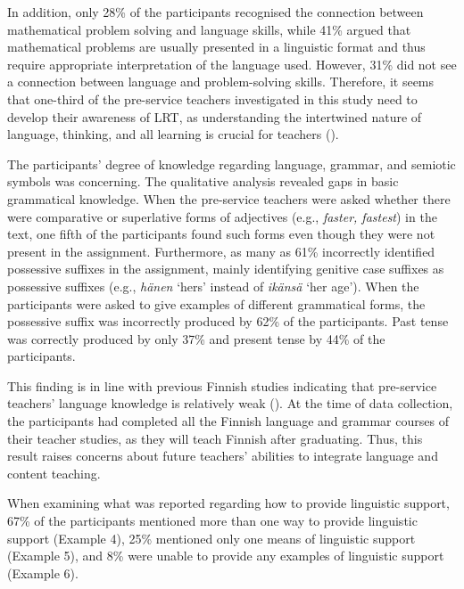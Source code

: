 \documentclass[output=paper]{langscibook}
\begin{document}
In addition, only 28\% of the participants recognised the connection between mathematical problem solving and language skills, while 41\% argued that mathematical problems are usually presented in a linguistic format and thus require appropriate interpretation of the language used. However, 31\% did not see a connection between language and problem-solving skills. Therefore, it seems that one-third of the pre-service teachers investigated in this study need to develop their awareness of LRT, as understanding the intertwined nature of language, thinking, and all learning is crucial for teachers (\citealt{Alisaari2020_Apples,CumminsEarly2015,LucasVillegas2013,Vygotsky1986}).

\begin{sloppypar}
The participants’ degree of knowledge regarding language, grammar, and semiotic symbols was concerning. The qualitative analysis revealed gaps in basic grammatical knowledge. When the pre-service teachers were asked whether there were comparative or superlative forms of adjectives (e.g., \textit{faster, fastest}) in the text, one fifth of the participants found such forms even though they were not present in the assignment. Furthermore, as many as 61\% incorrectly identified possessive suffixes in the assignment, mainly identifying genitive case suffixes as possessive suffixes (e.g., \textit{hänen} `hers' instead of \textit{ikänsä} `her age'). When the participants were asked to give examples of different grammatical forms, the possessive suffix was incorrectly produced by 62\% of the participants. Past tense was correctly produced by only 37\% and present tense by 44\% of the participants.
\end{sloppypar}

This finding is in line with previous Finnish studies indicating that pre-service teachers’ language knowledge is relatively weak (\citealt{TainioMarjokorpi2014,TainioRoutarinne2012}). At the time of data collection, the participants had completed all the Finnish language and grammar courses of their teacher studies, as they will teach Finnish after graduating. Thus, this result raises concerns about future teachers’ abilities to integrate language and content teaching.

When examining what was reported regarding how to provide linguistic support, 67\% of the participants mentioned more than one way to provide linguistic support (Example 4), 25\% mentioned only one means of linguistic support (Example 5), and 8\% were unable to provide any examples of linguistic support (Example 6). 
\end{document}
